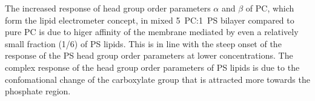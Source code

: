 The increased response of head group order parameters $\alpha$ and $\beta$ of PC, which form the lipid electrometer concept,
in mixed 5~PC:1~PS bilayer compared to pure PC
is due to higer affinity of the membrane mediated by even a relatively small fraction (1/6) of PS lipids. 
This is in line with the steep onset of the response of the PS head group order parameters at lower concentrations.
The complex response of the head group order parameters of PS lipids 
is due to the confomational change of the carboxylate group that is attracted more towards the phosphate region. 



\begin{figure}[tb!]
  \centering
  \hfill
{}\hfill
{}
\end{figure}
